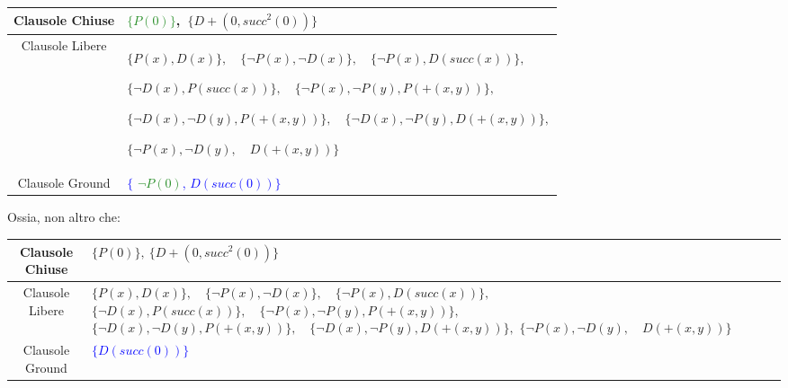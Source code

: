 \documentclass[a4paper,10pt]{article}
\begin{document}
\begin{table}[h]
    \centering
    \small 
    \renewcommand{\arraystretch}{1.5} 
    
    \begin{tabularx}{\textwidth}{|c|>{\centering\arraybackslash}X|}
        \hline
        Clausole Chiuse & \textcolor{ForestGreen}{$\{P(0)\}$}, $\ \{D+(0,succ^2(0))\}$ \\
        \hline
        Clausole Libere & 
            $\{P(x), D(x)\},\quad \{\lnot P(x), \lnot D(x)\},\quad \{\lnot P(x), D(succ(x))\},$ \newline
            
            $\{\lnot D(x), P(succ(x))\},\quad \{\lnot P(x), \lnot P(y), P(+(x, y))\},$\newline
            
            $\{\lnot D(x), \lnot D(y), P(+(x, y))\},\quad \{\lnot D(x), \lnot P(y), D(+(x, y))\},$ \newline
            
            $\{\lnot P(x), \lnot D(y),\quad D(+(x, y))\}$ 
            \\
        \hline
        Clausole Ground & \textcolor{blue}{$\{$ \textcolor{ForestGreen}{\sout{$\lnot P(0)$}}, $D(succ(0))\}$} \\
        \hline
    \end{tabularx}
\end{table}

Ossia, non altro che:

\begin{table}[h]
    \centering
    \small 
    \renewcommand{\arraystretch}{1.5} 
    
    \begin{tabularx}{\textwidth}{|c|>{\centering\arraybackslash}X|}
        \hline
        Clausole Chiuse & $\{P(0)\}, \ \{D+(0,succ^2(0))\}$ \\
        \hline
        Clausole Libere & 
            $\{P(x), D(x)\},\quad \{\lnot P(x), \lnot D(x)\},\quad \{\lnot P(x), D(succ(x))\},$\newline
            $\{\lnot D(x), P(succ(x))\},\quad \{\lnot P(x), \lnot P(y), P(+(x, y))\},$\newline
            $\{\lnot D(x), \lnot D(y), P(+(x, y))\},\quad \{\lnot D(x), \lnot P(y), D(+(x, y))\},$\newline
            $\{\lnot P(x), \lnot D(y),\quad D(+(x, y))\}$ 
            \\
        \hline
        Clausole Ground & \textcolor{blue}{$\{D(succ(0))\}$} \\
        \hline
    \end{tabularx}
\end{table}
\end{document}
